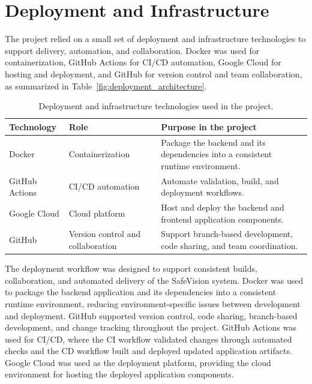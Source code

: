 \section{Deployment and Infrastructure}

The project relied on a small set of deployment and infrastructure technologies to support delivery, automation, and collaboration. Docker was used for containerization, GitHub Actions for CI/CD automation, Google Cloud for hosting and deployment, and GitHub for version control and team collaboration, as summarized in Table~\ref{fig:deployment_architecture}. 

\begin{table}[H]
\centering
\begin{tabular}{p{3.2cm} p{4cm} p{6.5cm}}
\toprule
\textbf{Technology} & \textbf{Role} & \textbf{Purpose in the project} \\
\midrule
Docker & Containerization & Package the backend and its dependencies into a consistent runtime environment. \\

GitHub Actions & CI/CD automation & Automate validation, build, and deployment workflows. \\

Google Cloud & Cloud platform & Host and deploy the backend and frontend application components. \\

GitHub & Version control and collaboration & Support branch-based development, code sharing, and team coordination. \\
\bottomrule
\end{tabular}
\caption{Deployment and infrastructure technologies used in the project.}
\label{tab:deployment_infrastructure_tech}
\end{table}

The deployment workflow was designed to support consistent builds, collaboration, and automated delivery of the \gls{SafeVision} system. Docker was used to package the backend application and its dependencies into a consistent runtime environment, reducing environment-specific issues between development and deployment. GitHub supported version control, code sharing, branch-based development, and change tracking throughout the project. GitHub Actions was used for CI/CD, where the CI workflow validated changes through automated checks and the CD workflow built and deployed updated application artifacts. Google Cloud was used as the deployment platform, providing the cloud environment for hosting the deployed application components.

